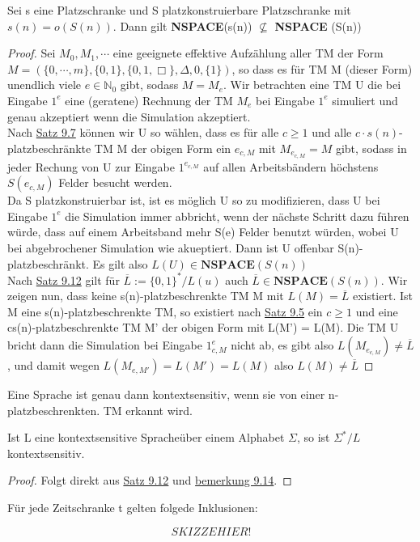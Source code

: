     Sei s eine Platzschranke und S platzkonstruierbare Platzschranke mit \(s(n) = o(S(n))\). Dann gilt \textbf{NSPACE}(s(n)) \(\not \subseteq\) \textbf{NSPACE} (S(n))
    \begin{proof}
        Sei \(M_0, M_1, \cdots\) eine geeignete effektive Aufzählung aller TM der Form \(M = (\{0, \cdots, m\}, \{0, 1\}, \{0, 1, \Box\}, \Delta, 0, \{1\})\), so dass es für TM M (dieser Form) unendlich viele \(e \in \mathbb{N}_0\) gibt, sodass \(M = M_e\). Wir betrachten eine TM U die bei Eingabe \(1^e\) eine (geratene) Rechnung der TM \(M_e\) bei Eingabe \(1^e\) simuliert und genau akzeptiert wenn die Simulation akzeptiert. 
        \vspace*{0.5cm}
        \\
        Nach \hyperref[subsec:9.7]{Satz 9.7} können wir U so wählen, dass es für alle \(c \geq 1\) und alle \(c \cdot s(n)\)-platzbeschränkte TM M der obigen Form ein \(e_{c,M}\) mit \(M_{e_{c,M}} = M\) gibt, sodass in jeder Rechung von U zur Eingabe \(1^{e_{c,M}}\) auf allen Arbeitsbändern höchstens \(S(e_{c,M})\) Felder besucht werden.
        \vspace*{0.5cm}
        \\
        Da S platzkonstruierbar ist, ist es möglich U so zu modifizieren, dass U bei Eingabe \(1^e\) die Simulation immer abbricht, wenn der nächste Schritt dazu führen würde, dass auf einem Arbeitsband mehr S(e) Felder benutzt würden, wobei U bei abgebrochener Simulation wie akueptiert. Dann ist U offenbar S(n)-platzbeschränkt. Es gilt also \(L(U) \in \textbf{NSPACE}(S(n))\)
        \vspace*{0.5cm}
        \\
        Nach \hyperref[subsec:9.12]{Satz 9.12} gilt für \(\overline{L} := \{0,1\}^* / L(u)\) auch \(\overline{L} \in \textbf{NSPACE} (S(n))\). Wir zeigen nun, dass keine s(n)-platzbeschrenkte TM M mit \(L(M) = \overline{L}\) existiert. Ist M eine s(n)-platzbeschrenkte TM, so existiert nach \hyperref[label]{Satz 9.5} ein \(c \geq 1\) und eine cs(n)-platzbeschrenkte TM M' der obigen Form mit L(M') = L(M). Die TM U bricht dann die Simulation bei Eingabe \(1^e_{c,M}\) nicht ab, es gibt also \(L(M_{e_{c,M}}) \not = \overline{L}\), und damit wegen \(L(M_{e,M'}) = L(M') = L(M)\) also \(L(M) \not = \overline{L}\)
    \end{proof}

    Eine Sprache ist genau dann kontextsensitiv, wenn sie von einer n-platzbeschrenkten. TM erkannt wird.

    Ist L eine kontextsensitive Spracheüber einem Alphabet \(\Sigma\), so ist \(\Sigma^* / L\) kontextsensitiv.
    \begin{proof}
        Folgt direkt aus \hyperref[subsec:9.12]{Satz 9.12} und \hyperref[subsec:9.14]{bemerkung 9.14}.
    \end{proof}

    Für jede Zeitschranke t gelten folgede Inklusionen:
    
    \[SKIZZE HIER !\]

    